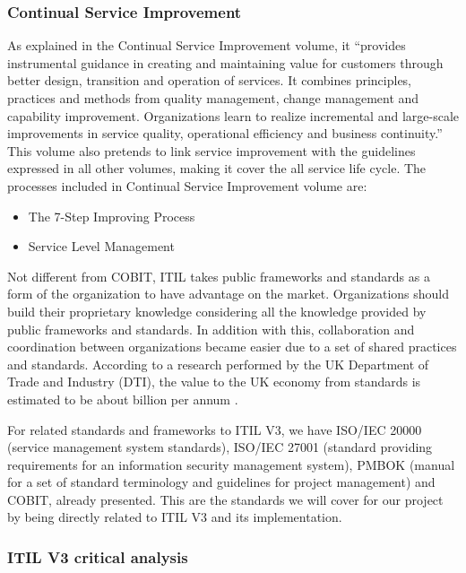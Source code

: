\subsubsection{Continual Service Improvement}

As explained in the Continual Service Improvement volume, it ``provides instrumental guidance in creating and maintaining value for customers through better design, transition and operation of services. It combines principles, practices and methods from quality management, change management and capability improvement. Organizations learn to realize incremental and large-scale improvements in service quality, operational efficiency and business continuity.''\cite{itilST} This volume also pretends to link service improvement with the guidelines expressed in all other volumes, making it cover the all service life cycle. The processes included in Continual Service Improvement volume are:

\begin{itemize}
  \item The 7-Step Improving Process
  \item Service Level Management
\end{itemize} 

\par Not different from COBIT,  ITIL takes public frameworks and standards as a form of the organization to have advantage on the market. Organizations should build their proprietary knowledge considering  all the knowledge provided by public frameworks and standards. In addition with this, collaboration and coordination between organizations became easier due to a set of shared practices and standards. According to a research performed by the UK Department of Trade and Industry (DTI), the value to the UK economy from standards is estimated to be about  billion per annum \cite{McNeillis01112005}.\par
For related standards and frameworks to ITIL V3, we have ISO/IEC 20000 (service management system standards), ISO/IEC 27001 (standard providing requirements for an information security management system), PMBOK (manual for a set of standard terminology and guidelines for project management)\cite{pmbok5} and COBIT\cite{2012cobit}, already presented. This are the standards we will cover for our project by being directly related to ITIL V3 and its implementation.


\subsubsection{ITIL V3 critical analysis}


